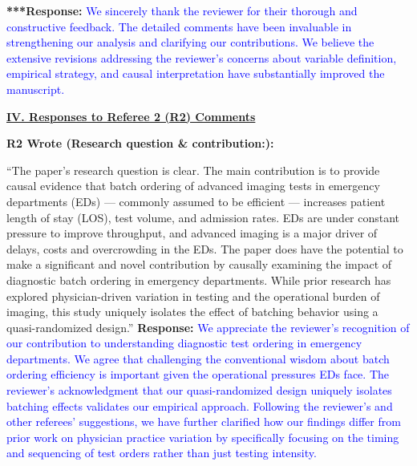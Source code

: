 \documentclass[11pt]{article}
\newenvironment{quote2}
{ \bigskip
\noindent
         \small\em
         \baselineskip=14pt
}
\newcommand{\1}{\hbox{\rm 1\kern-.35em 1}}
\begin{document}
{\noindent\textbf{***Response:} \textcolor{blue}{We sincerely thank the reviewer for their thorough and constructive feedback. The detailed comments have been invaluable in strengthening our analysis and clarifying our contributions. We believe the extensive revisions addressing the reviewer's concerns about variable definition, empirical strategy, and causal interpretation have substantially improved the manuscript.}



\clearpage


\pagestyle{fancy}
\fancyhead{}
\renewcommand{\headrulewidth}{0pt}

\noindent\underline{\textbf{IV. Responses to Referee 2 (R2) Comments}}



\begin{quote2}
\textbf{R2 Wrote (Research question \& contribution:):}  

\noindent``The paper’s research question is clear. The main contribution is to provide causal evidence that batch ordering of advanced imaging tests in emergency departments (EDs) — commonly assumed to be efficient — increases patient length of stay (LOS), test volume, and admission rates. EDs are under constant pressure to improve throughput, and advanced imaging is a major driver of delays, costs and overcrowding in the EDs. The paper does have the potential to make a significant and novel contribution by causally examining the impact of diagnostic batch ordering in emergency departments. While prior research has explored physician-driven variation in testing and the operational burden of imaging, this study uniquely isolates the effect of batching behavior using a quasi-randomized design.”
\end{quote2}

\noindent\textbf{Response:} \textcolor{blue}{We appreciate the reviewer's recognition of our contribution to understanding diagnostic test ordering in emergency departments. We agree that challenging the conventional wisdom about batch ordering efficiency is important given the operational pressures EDs face. The reviewer's acknowledgment that our quasi-randomized design uniquely isolates batching effects validates our empirical approach. Following the reviewer's and other referees' suggestions, we have further clarified how our findings differ from prior work on physician practice variation by specifically focusing on the timing and sequencing of test orders rather than just testing intensity.}

}
\end{document}
